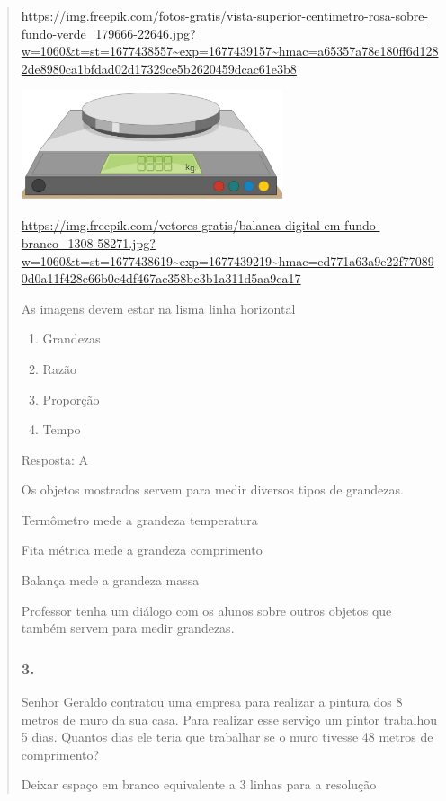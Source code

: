 \begin{enumerate}
\begin{escolha}
\begin{enumerate}
\begin{itemize}
\begin{itemize}
\begin{escolha}
\begin{quote}
\begin{escolha}
{\url{https://img.freepik.com/fotos-gratis/vista-superior-centimetro-rosa-sobre-fundo-verde_179666-22646.jpg?w=1060\&t=st=1677438557~exp=1677439157~hmac=a65357a78e180ff6d1282de8980ca1bfdad02d17329ce5b2620459dcac61e3b8}

\includegraphics[width=3.02500in,height=1.27488in]{media/image130.png}

\url{https://img.freepik.com/vetores-gratis/balanca-digital-em-fundo-branco_1308-58271.jpg?w=1060\&t=st=1677438619~exp=1677439219~hmac=ed771a63a9e22f770890d0a11f428e66b0c4df467ac358bc3b1a311d5aa9ca17}

As imagens devem estar na lisma linha horizontal

\begin{enumerate}
\def\labelenumi{\alph{enumi})}
\item
  Grandezas
\item
  Razão
\item
  Proporção
\item
  Tempo
\end{enumerate}

Resposta: A

Os objetos mostrados servem para medir diversos tipos de grandezas.

Termômetro mede a grandeza temperatura

Fita métrica mede a grandeza comprimento

Balança mede a grandeza massa

Professor tenha um diálogo com os alunos sobre outros objetos que também
servem para medir grandezas.

\subsubsection{3.}\label{section-119}

Senhor Geraldo contratou uma empresa para realizar a pintura dos 8
metros de muro da sua casa. Para realizar esse serviço um pintor
trabalhou 5 dias. Quantos dias ele teria que trabalhar se o muro tivesse
48 metros de comprimento?

Deixar espaço em branco equivalente a 3 linhas para a resolução

}
\end{escolha}
\end{quote}
\end{escolha}
\end{itemize}
\end{itemize}
\end{enumerate}
\end{escolha}
\end{enumerate}

